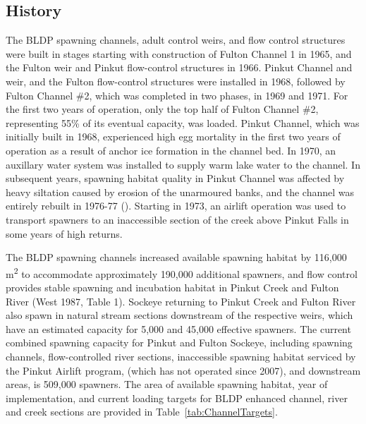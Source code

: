 \documentclass[french,11pt]{book}
\begin{document}
\label{babine-lake-development-project}

\subsection{History}\label{history}

The BLDP spawning channels, adult control weirs, and flow control structures were built in stages starting with construction of Fulton Channel 1 in 1965, and the Fulton weir and Pinkut flow-control structures in 1966. Pinkut Channel and weir, and the Fulton flow-control structures were installed in 1968, followed by Fulton Channel \#2, which was completed in two phases, in 1969 and 1971. For the first two years of operation, only the top half of Fulton Channel \#2, representing 55\% of its eventual capacity, was loaded. Pinkut Channel, which was initially built in 1968, experienced high egg mortality in the first two years of operation as a result of anchor ice formation in the channel bed. In 1970, an auxillary water system was installed to supply warm lake water to the channel. In subsequent years, spawning habitat quality in Pinkut Channel was affected by heavy siltation caused by erosion of the unarmoured banks, and the channel was entirely rebuilt in 1976-77 (). Starting in 1973, an airlift operation was used to transport spawners to an inaccessible section of the creek above Pinkut Falls in some years of high returns.

The BLDP spawning channels increased available spawning habitat by 116,000 m\textsuperscript{2} to accommodate approximately 190,000 additional spawners, and flow control provides stable spawning and incubation habitat in Pinkut Creek and Fulton River (West 1987, Table 1). Sockeye returning to Pinkut Creek and Fulton River also spawn in natural stream sections downstream of the respective weirs, which have an estimated capacity for 5,000 and 45,000 effective spawners. The current combined spawning capacity for Pinkut and Fulton Sockeye, including spawning channels, flow-controlled river sections, inaccessible spawning habitat serviced by the Pinkut Airlift program, (which has not operated since 2007), and downstream areas, is 509,000 spawners. The area of available spawning habitat, year of implementation, and current loading targets for BLDP enhanced channel, river and creek sections are provided in Table~\ref{tab:ChannelTargets}.
\end{document}
